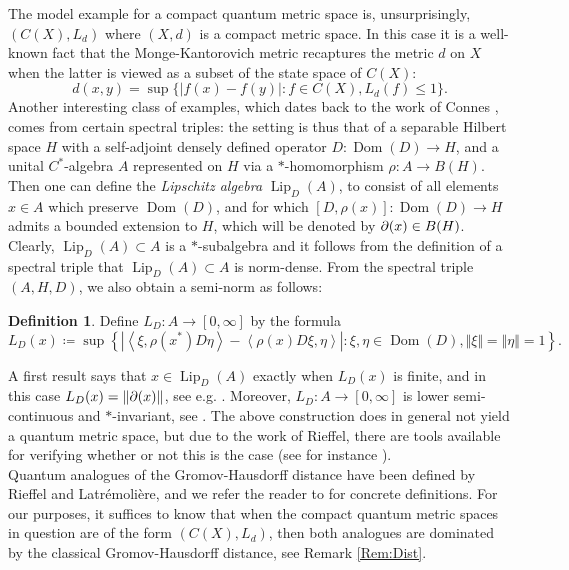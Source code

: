 \documentclass[11pt, reqno, a4paper, final]{amsart}
\theoremstyle{plain}
\theoremstyle{definition}
\newtheorem{definition}[thm]{Definition}
\renewcommand{\leq}{\leqslant}
\newcommand{\Dom}{\operatorname{Dom}}
\newcommand{\Lip}{\operatorname{Lip}}
\newcommand{\black}{\color{black}}
\begin{document}
The model example for a compact quantum metric space is, unsurprisingly, $(C(X),L_{d})$ where $(X,d)$ is a compact metric space. In this case it is a well-known fact that the Monge-Kantorovich metric recaptures the metric $d$ on $X$ when the latter is viewed as a subset of the state space of $C(X)$:
\[
d(x,y)=\sup\{|f(x)-f(y)| : f\in C(X), L_d(f)\leq 1\}.
\]
Another interesting class of examples, which dates back to {\black the work of }Connes \cite{Connes}, comes from certain spectral triples:
the setting is thus that of a separable Hilbert space $H$ with  a self-adjoint densely defined operator $D\colon \Dom(D)\to H$, and a unital $C^*$-algebra  $A$ represented on $H$ via a $*$-homomorphism $\rho\colon A \to B(H)$.
Then one can  define the \emph{Lipschitz algebra} $\Lip_D(A)$, to {\black consist of all elements} $x\in A$ which preserve $\Dom(D)$, and for which $[D,\rho(x)]\colon \Dom(D) \to H$ admits a bounded extension to $H$, which will be denoted by ${\black \partial}(x)\in B(H)$. {\black Clearly, $\Lip_D(A) \subset A$ is a $*$-subalgebra and it follows from the definition of a spectral triple that $\Lip_D(A) \subset A$ is norm-dense.} From the spectral triple {\black $(A,H,D)$}, we also obtain a semi-norm as follows:
\begin{definition}
Define $L_D\colon A\to [0,\infty]$ by the formula
$$L_D(x)\coloneqq \sup \left\{ \left\vert \left\langle\xi,\rho(x^*)D\eta\right\rangle - \left\langle \rho(x)D\xi,\eta \right\rangle \right\vert : {\xi,\eta \in \Dom(D), \Vert \xi\Vert = \Vert \eta \Vert=1} \right\} .$$
\end{definition}
A first result says that $x\in \Lip_D(A)$ exactly when $L_D(x)$ is finite, and in this case $L_D(x)=\Vert {\black \partial}(x)\Vert$, see e.g. \cite[Lemma 2.3]{Kaad-Aguilar}. {\black Moreover, $L_D : A \to [0,\infty]$ is lower semi-continuous and $*$-invariant, see \cite[Proposition 3.7]{Rieffel-2}.}
The above construction does in general not yield a quantum metric space, but due to the work of Rieffel, there are tools available for verifying whether or not this is the case (see for instance {\black \cite[Theorem 1.8]{Rieffel-1}}).\\

Quantum analogues of the Gromov-Hausdorff distance have been defined by Rieffel and Latrémolière, and we refer the reader to \cite{Rieffel-distance,Latremoliere} for concrete definitions. For our purposes, it suffices to know that when the compact quantum metric spaces in question are of the form $(C(X),L_{d})$, then both analogues are dominated by the classical Gromov-Hausdorff distance, see Remark \ref{Rem:Dist}.
\\
\end{document}
